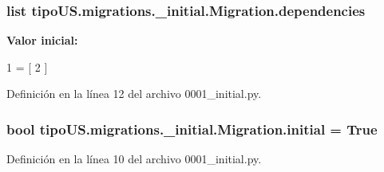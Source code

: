 \subsubsection[{\texorpdfstring{dependencies}{dependencies}}]{\setlength{\rightskip}{0pt plus 5cm}list tipo\+U\+S.\+migrations.\+\_\+initial.\+Migration.\+dependencies\hspace{0.3cm}{\ttfamily [static]}}\hypertarget{classtipo_u_s_1_1migrations_1_10001__initial_1_1_migration_a48568504ede6e2526dd5dbb8b563bb34}{}\label{classtipo_u_s_1_1migrations_1_10001__initial_1_1_migration_a48568504ede6e2526dd5dbb8b563bb34}
{\bfseries Valor inicial\+:}
\begin{DoxyCode}
1 = [
2     ]
\end{DoxyCode}


Definición en la línea 12 del archivo 0001\+\_\+initial.\+py.

\subsubsection[{\texorpdfstring{initial}{initial}}]{\setlength{\rightskip}{0pt plus 5cm}bool tipo\+U\+S.\+migrations.\+\_\+initial.\+Migration.\+initial = True\hspace{0.3cm}{\ttfamily [static]}}\hypertarget{classtipo_u_s_1_1migrations_1_10001__initial_1_1_migration_af95ca5a99e19092af234ec3a97db6cdc}{}\label{classtipo_u_s_1_1migrations_1_10001__initial_1_1_migration_af95ca5a99e19092af234ec3a97db6cdc}


Definición en la línea 10 del archivo 0001\+\_\+initial.\+py.

